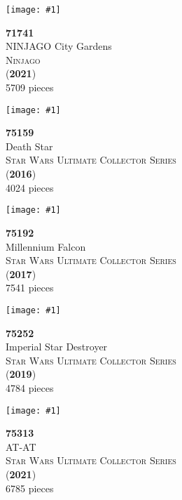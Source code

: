 \documentclass[letterpaper]{article}%
\newenvironment{legocell}[1]
{
	\begin{minipage}[c][2.0in][c]{4in}
	\centering
	\varwidth{3.6in}
	\raggedright %
	\begin{minipage}[c]{1.3in}
		\texttt{[image: \#1]}
	\end{minipage}
	\begin{minipage}[c]{2.2in}
	\raggedright
}
{
	\end{minipage}
	\endvarwidth
	\end{minipage}
	\allowbreak
	\ignorespaces
}
\begin{document}
\begin{legocell}{images/set_71741-1.jpg}
\textbf{71741}\\
{\sffamily\large NINJAGO City Gardens}\\
\textsc{\color{DarkBlue}\normalsize Ninjago}\\
(\textbf{2021})\\
{\normalsize 5709 pieces}\\
\end{legocell}
\begin{legocell}{images/set_75159-1.jpg}
\textbf{75159}\\
{\sffamily\large Death Star}\\
\textsc{\color{DarkBlue}\normalsize Star Wars Ultimate Collector Series}\\
(\textbf{2016})\\
{\normalsize 4024 pieces}\\
\end{legocell}
\begin{legocell}{images/set_75192-1.jpg}
\textbf{75192}\\
{\sffamily\large Millennium Falcon}\\
\textsc{\color{DarkBlue}\normalsize Star Wars Ultimate Collector Series}\\
(\textbf{2017})\\
{\normalsize 7541 pieces}\\
\end{legocell}
\begin{legocell}{images/set_75252-1.jpg}
\textbf{75252}\\
{\sffamily\large Imperial Star Destroyer}\\
\textsc{\color{DarkBlue}\normalsize Star Wars Ultimate Collector Series}\\
(\textbf{2019})\\
{\normalsize 4784 pieces}\\
\end{legocell}
\begin{legocell}{images/set_75313-1.jpg}
\textbf{75313}\\
{\sffamily\large AT-AT}\\
\textsc{\color{DarkBlue}\normalsize Star Wars Ultimate Collector Series}\\
(\textbf{2021})\\
{\normalsize 6785 pieces}\\
\end{legocell}
\end{document}
